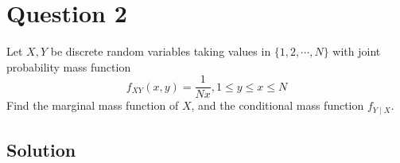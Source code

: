 \section*{Question 2}

Let \( X, Y \) be discrete random variables taking values in \( \{1,2, \cdots, N\} \) with joint probability mass function
\begin{equation*}
    f_{X Y}(x, y)=\frac{1}{N x}, 1 \leq y \leq x \leq N
\end{equation*}
Find the marginal mass function of \( X \), and the conditional mass function \( f_{Y \mid X} \).

\subsection*{Solution}
